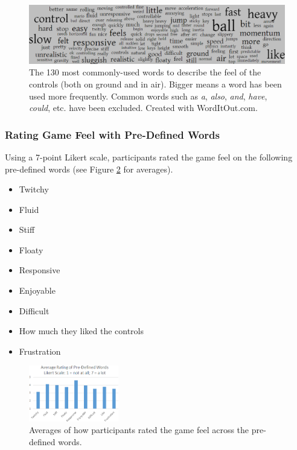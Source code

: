 \begin{figure}[htbp]
\centering
\includegraphics[width=1\textwidth]{Pics/wordcloud}
\caption{The 130 most commonly-used words to describe the feel of the controls (both on ground and in air). Bigger means a word has been used more frequently. Common words such as \textit{a}, \textit{also}, \textit{and}, \textit{have}, \textit{could}, etc. have been excluded. Created with WordItOut.com.}
\label{fig:wordcloud}
\end{figure}

\subsubsection{Rating Game Feel with Pre-Defined Words}
Using a 7-point Likert scale, participants rated the game feel on the following pre-defined words (see Figure \ref{fig:average_rating} for averages).
\begin{itemize}[noitemsep,nolistsep]
\item Twitchy
\item Fluid
\item Stiff
\item Floaty
\item Responsive
\item Enjoyable
\item Difficult
\item How much they liked the controls
\item Frustration
\end{itemize}

\begin{figure}[htbp]
\centering
\includegraphics[width=0.35\textwidth]{Pics/average_rating}
\caption{Averages of how participants rated the game feel across the pre-defined words.}
\label{fig:average_rating}
\end{figure}

